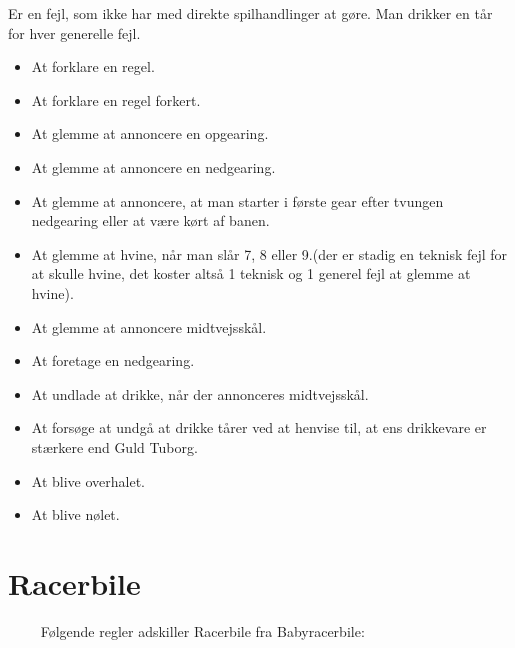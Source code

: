 \documentclass[12pt]{article}
\begin{document}
Er en fejl, som ikke har med direkte spilhandlinger at gøre. Man drikker en tår for hver generelle fejl.

\begin{itemize}
	\item At forklare en regel.
	\item At forklare en regel forkert.
	\item At glemme at annoncere en opgearing.
	\item At glemme at annoncere en nedgearing.
	\item At glemme at annoncere, at man starter i første gear efter tvungen nedgearing eller at være kørt af banen.
	\item At glemme at hvine, når man slår 7, 8 eller 9.(der er stadig en teknisk fejl for at skulle hvine, det koster altså 1 teknisk og 1 generel fejl at glemme at hvine).
	\item At glemme at annoncere midtvejsskål.
	\item At foretage en nedgearing.
	\item At undlade at drikke, når der annonceres midtvejsskål.
	\item At forsøge at undgå at drikke tårer ved at henvise til, at ens drikkevare er stærkere end Guld Tuborg.
	\item At blive overhalet.
	\item At blive nølet.
\end{itemize}

\newpage

\section*{Racerbile}

$\qquad$  Følgende regler adskiller Racerbile fra Babyracerbile:
\end{document}
